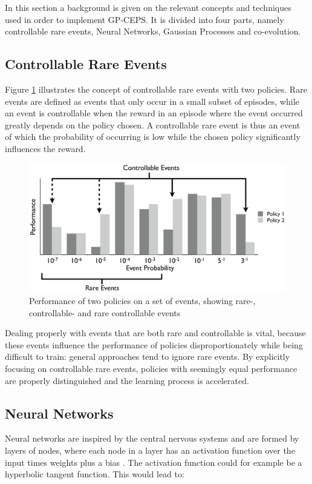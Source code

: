 In this section a background is given on the relevant concepts and techniques used in order to implement GP-CEPS. It is divided into four parts, namely controllable rare events, Neural Networks, Gaussian Processes and co-evolution. 

\subsection{Controllable Rare Events}
Figure \ref{rareControllableImage} illustrates the concept of controllable rare events with two policies. Rare events are defined as events that only occur in a small subset of episodes, while an event is controllable when the reward in an episode where the event occurred greatly depends on the policy chosen. A controllable rare event is thus an event of which the probability of occurring is low while the chosen policy significantly influences the reward.

\begin{figure}[ht]
  \centering
  \includegraphics[scale=0.5]{images/rare-controllable.png}
  \caption{Performance of two policies on a set of events, showing rare-, controllable- and rare controllable events}\label{rareControllableImage}
\end{figure}

Dealing properly with events that are both rare and controllable is vital, because these events influence the performance of policies disproportionately while being difficult to train: general approaches tend to ignore rare events. By explicitly focusing on controllable rare events, policies with seemingly equal performance are properly distinguished and the learning process is accelerated.

\subsection{Neural Networks}
Neural networks are inspired by the central nervous systems and are formed by layers of nodes, where each node in a layer has an activation function over the input times weights plus a bias \cite{bishop1995neural}. The activation function could for example be a hyperbolic tangent function. This would lead to:

